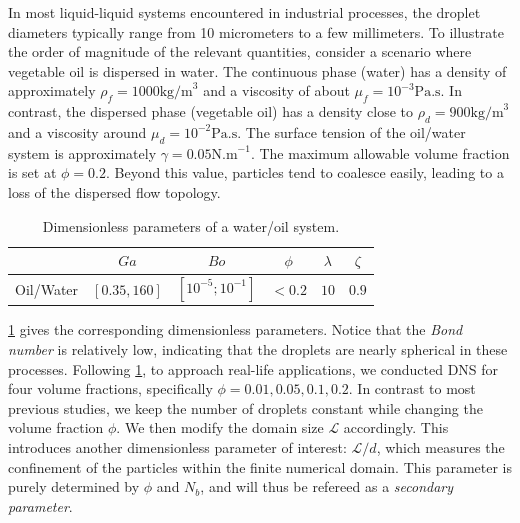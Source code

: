 \documentclass[11pt]{My_preprint}
\begin{document}
In most liquid-liquid systems encountered in industrial processes, the droplet diameters typically range from 10 micrometers to a few millimeters. To illustrate the order of magnitude of the relevant quantities, consider a scenario where vegetable oil is dispersed in water. The continuous phase (water) has a density of approximately $\rho_f = 1000 \text{kg/m}^3$ and a viscosity of about $\mu_f = 10^{-3} \text{Pa.s}$. In contrast, the dispersed phase (vegetable oil) has a density close to $\rho_d = 900 \text{kg/m}^3$ and a viscosity around $\mu_d = 10^{-2} \text{Pa.s}$.
The surface tension of the oil/water system is approximately $\gamma = 0.05 \text{N.m}^{-1}$. The maximum allowable volume fraction is set at $\phi = 0.2$. Beyond this value, particles tend to coalesce easily, leading to a loss of the dispersed flow topology.\begin{table}[h!]
    \centering
    \caption{Dimensionless parameters of a water/oil system.}
    \begin{tabular}{|c||c|c|c|c|c|}
        \hline&$Ga$&$Bo$&$\phi$&$\lambda$&$\zeta$\\ \hline
        \hline Oil/Water&$[0.35,160]$&$[10^{-5};10^{-1}]$&$<0.2$&$10$&$0.9$\\ \hline
    \end{tabular}
    \label{tab:parameters_exp}
\end{table}
\ref{tab:parameters_exp} gives the corresponding dimensionless parameters.  
Notice that the \textit{Bond number} is relatively low, indicating that the droplets are nearly spherical in these processes.
Following \ref{tab:parameters_exp}, to approach real-life applications, we conducted DNS for four volume fractions, specifically $\phi = 0.01,0.05,0.1,0.2$.
In contrast to most previous studies, we keep the number of droplets constant while changing the volume fraction $\phi$. 
We then modify the domain size $\mathcal{L}$ accordingly. 
This introduces another dimensionless parameter of interest: $\mathcal{L}/d$, which measures the confinement of the particles within the finite numerical domain. 
This parameter is purely determined by $\phi$ and $N_b$, and will thus be refereed as a \textit{secondary parameter}.
\end{document}
